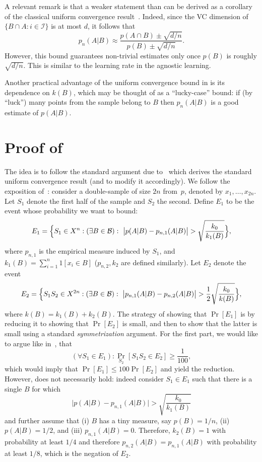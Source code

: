 \documentclass{article}
\newcommand{\B}{{\cal B}}
\newcommand{\I}{\mathcal{I}}
\begin{document}
A relevant remark is that a weaker statement than 
can be derived as a corollary of the classical uniform convergence
result~\cite{vapnik}. 
Indeed, since the VC dimension of $\{B\cap A : i\in \I\}$ is at most $d$, it follows that 
\[p_n(A\vert B)\approx\frac{p(A\cap B) \pm \sqrt{d/n}}{p(B)\pm \sqrt{d/n}}.\]
However, this bound guarantees non-trivial estimates only once $p(B)$ is roughly $\sqrt{d/n}$.
This is similar to the learning rate in the agnostic learning.

Another practical advantage of the uniform convergence bound in  is its dependence on $k(B)$,
which may be thought of as a ``lucky-case'' bound:
if (by ``luck'') many points from the sample belong to $B$ 
then $p_n(A\vert B)$ is a good estimate of $p(A\vert B)$.



\section{Proof of }

The idea is to follow the standard argument due to~\cite{vapnik} 
which derives the standard uniform convergence result (and to modify it accordingly). 
We follow the exposition of~\cite{anthony}:
consider a double-sample of size $2n$ from~$p$, denoted by $x_1,\ldots,x_{2n}$.
Let $S_1$ denote the first half of the sample and $S_2$ the second.
Define $E_1$ to be the event whose probability we want to bound:
\[E_1 = \Bigl\{ S_1\in X^n : (\exists B\in \B):~ 
\bigl\lvert p(A \vert B) - p_{n,1}(A \vert B) \bigr\rvert > 
\sqrt{\frac{k_0}{k_{1}(B)}} \Bigr\},\]
where $p_{n,1}$ is the empirical measure induced by $S_1$, 
and $k_{1}(B)=\sum_{i=1}^n 1[x_i\in B]$ ($p_{n,2}, k_{2}$ are defined similarly).
Let $E_2$ denote the event
\[E_2 = 
\Bigl\{
S_1S_2\in X^{2n} : (\exists B\in\B):~
\bigl\lvert p_{n,1}(A \vert B)   -  p_{n,2}(A \vert B) \bigr\rvert >  
{\frac{1}{2}}\sqrt{\frac{k_0}{k(B)}}
\Bigr\},
\]
where $k(B) = k_{1}(B)+k_{2}(B)$.
The strategy of showing that $\Pr[E_1]$ is by reducing it to showing that $\Pr[E_2]$ 
is small, and then to show that the latter is small using a standard \emph{symmetrization} argument. 
For the first part, we would like to argue like in~\cite{anthony}, that
\begin{equation}\label{eq:anthony} 
(\forall S_1\in E_1): \Pr_{S_2}[S_1S_2\in E_2]\geq \frac{1}{100},
\end{equation}
which would imply that $\Pr[E_1]\leq 100\Pr[E_2]$ and yield the reduction.
However,  does not necessarily hold: indeed consider
$S_1\in E_1$ such that there is a single $B$ for which 
\[
\bigl\lvert p(A \vert B) - p_{n,1}(A \vert B) \bigr\rvert > 
\sqrt{\frac{k_0}{k_{1}(B)}}
\]
and further assume that 
(i) $B$ has a tiny measure, say $p(B) = 1/n$,
(ii) $p(A\vert B)= 1/2$, and
(iii) $p_{n,1}(A\vert B) = 0$.
Therefore, $k_2(B)=1$ with probability at least $1/4$
and therefore $p_{n,2}(A \vert B)=p_{n,1}(A \vert B)$
with probability at least $1/8$, which is the negation of $E_2$.
\end{document}
